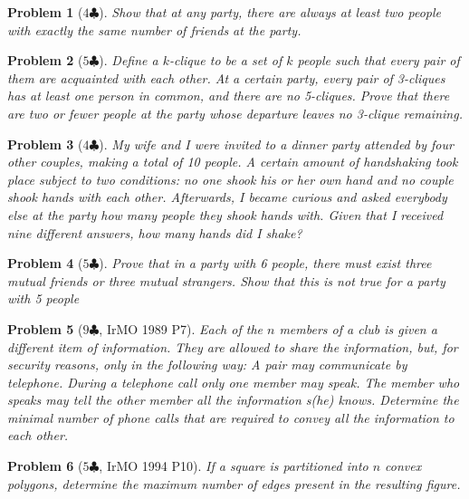 \documentclass[a4paper]{scrartcl}
\newcommand{\score}[1]{{\color{blue}$#1\clubsuit$}}
\newcommand{\scoremandatory}[1]{{\color{red}$#1\clubsuit$}}
\newtheorem{prob}{Problem}
\begin{document}
\begin{prob}[\scoremandatory{4}]
	Show that at any party, there are always at least two people with exactly the same number of friends at the party.
\end{prob}

\begin{prob}[\score{5}]
	Define a $k$-clique to be a set of $k$ people such that every pair of them are acquainted with each other. At a certain party, every pair of 3-cliques has at least one person in common, and there are no 5-cliques. Prove that there are two or fewer people at the party whose departure leaves no 3-clique remaining.
\end{prob}

\begin{prob}[\score{4}]
	My wife and I were invited to a dinner party attended by four other couples, making a total of 10 people. A certain amount of handshaking took place subject to two conditions: no one shook his or her own hand and no couple shook hands with each other. Afterwards, I became curious and asked everybody else at the party how many people they shook hands with. Given that I received nine different answers, how many hands did I shake?
\end{prob}

\begin{prob}[\scoremandatory{5}]
Prove that in a party with 6 people, there must exist three mutual friends or three mutual strangers. Show that this is not true for a party with 5 people
\end{prob}

\begin{prob}[\score{9}, IrMO 1989 P7]
Each of the $n$ members of a club is given a different item of information. They are allowed to share the information, but, for security reasons, only in the following way: A pair may communicate by telephone. During a telephone call only one member may speak. The member who speaks may tell the other member all the information s(he) knows. Determine the minimal number of phone calls that are required to convey all the information to each other.
\end{prob}

\begin{prob}[\score{5}, IrMO 1994 P10]
If a square is partitioned into $n$ convex polygons, determine the maximum number of edges present in the resulting figure.
\end{prob}
\end{document}
